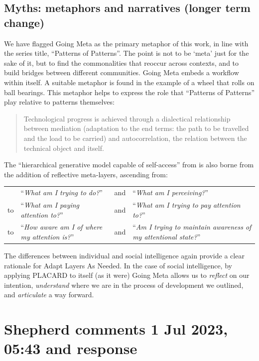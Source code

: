 \documentclass[acmlarge,timestamp]{acmart}
\begin{document}
\subsection{Myths: metaphors and narratives (longer term change)}
We have flagged {\sc Going Meta} as the primary metaphor of this work,
in line with the series title, “Patterns of Patterns”.  The point is
not to be ‘meta’ just for the sake of it, but to find the
commonalities that reoccur across contexts, and to build bridges
between different communities.  {\sc Going Meta} embeds a workflow
within itself.  A suitable metaphor is found in the example of a wheel
that rolls on ball bearings.  This metaphor helps to express the role
that “Patterns of Patterns” play relative to patterns themselves:
\begin{quote}
Technological progress is achieved through a dialectical relationship
between mediation (adaptation to the end terms: the path to be
travelled and the load to be carried) and autocorrelation, the
relation between the technical object and
itself. \cite{Simondon2005-pq}
\end{quote}
The “hierarchical generative model capable of self-access” from
\citet{albarracin2023designing} is also borne from the addition of
reflective meta-layers, ascending from:

{
\renewcommand*{\arraystretch}{1.2}
\begin{tabular}{lllp{}}
  &``\emph{What am I trying to do?}''&and&``\emph{What am I perceiving?}''\\
to&``\emph{What am I paying attention to?}''&and&``\emph{What am I trying to pay attention to?}''\\
to&``\emph{How aware am I of where my attention is?}''&and&``\emph{Am I trying to maintain awareness of my attentional state?}''
\end{tabular}
}

\medskip
\noindent The differences between individual and social intelligence
again provide a clear rationale for {\sc Adapt Layers As Needed}.  In
the case of social intelligence, by applying PLACARD to itself (as it
were) {\sc Going Meta} allows us to \emph{reflect} on our intention,
\emph{understand} where we are in the process of development we
outlined, and \emph{articulate} a way forward.

\section{Shepherd comments 1 Jul 2023, 05:43 and response}
\end{document}
